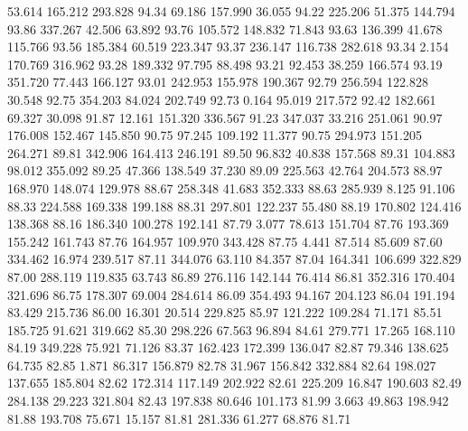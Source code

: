   53.614  165.212  293.828        94.34
  69.186  157.990   36.055        94.22
 225.206   51.375  144.794        93.86
 337.267   42.506   63.892        93.76
 105.572  148.832   71.843        93.63
 136.399   41.678  115.766        93.56
 185.384   60.519  223.347        93.37
 236.147  116.738  282.618        93.34
   2.154  170.769  316.962        93.28
 189.332   97.795   88.498        93.21
  92.453   38.259  166.574        93.19
 351.720   77.443  166.127        93.01
 242.953  155.978  190.367        92.79
 256.594  122.828   30.548        92.75
 354.203   84.024  202.749        92.73
   0.164   95.019  217.572        92.42
 182.661   69.327   30.098        91.87
  12.161  151.320  336.567        91.23
 347.037   33.216  251.061        90.97
 176.008  152.467  145.850        90.75
  97.245  109.192   11.377        90.75
 294.973  151.205  264.271        89.81
 342.906  164.413  246.191        89.50
  96.832   40.838  157.568        89.31
 104.883   98.012  355.092        89.25
  47.366  138.549   37.230        89.09
 225.563   42.764  204.573        88.97
 168.970  148.074  129.978        88.67
 258.348   41.683  352.333        88.63
 285.939    8.125   91.106        88.33
 224.588  169.338  199.188        88.31
 297.801  122.237   55.480        88.19
 170.802  124.416  138.368        88.16
 186.340  100.278  192.141        87.79
   3.077   78.613  151.704        87.76
 193.369  155.242  161.743        87.76
 164.957  109.970  343.428        87.75
   4.441   87.514   85.609        87.60
 334.462   16.974  239.517        87.11
 344.076   63.110   84.357        87.04
 164.341  106.699  322.829        87.00
 288.119  119.835   63.743        86.89
 276.116  142.144   76.414        86.81
 352.316  170.404  321.696        86.75
 178.307   69.004  284.614        86.09
 354.493   94.167  204.123        86.04
 191.194   83.429  215.736        86.00
  16.301   20.514  229.825        85.97
 121.222  109.284   71.171        85.51
 185.725   91.621  319.662        85.30
 298.226   67.563   96.894        84.61
 279.771   17.265  168.110        84.19
 349.228   75.921   71.126        83.37
 162.423  172.399  136.047        82.87
  79.346  138.625   64.735        82.85
   1.871   86.317  156.879        82.78
  31.967  156.842  332.884        82.64
 198.027  137.655  185.804        82.62
 172.314  117.149  202.922        82.61
 225.209   16.847  190.603        82.49
 284.138   29.223  321.804        82.43
 197.838   80.646  101.173        81.99
   3.663   49.863  198.942        81.88
 193.708   75.671   15.157        81.81
 281.336   61.277   68.876        81.71
